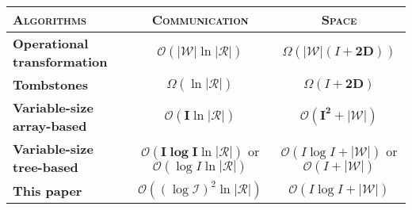 

\begin{tabular}{@{}lcc@{}}
  \toprule
  \textsc{Algorithms} & \textsc{Communication} & \textsc{Space} \\ \midrule 
  \textbf{Operational transformation~\cite{suleiman1997serialization, sun2009contextbased}} & $\mathcal{O}(\pmb{|\mathcal{W}|}\ln|\mathcal{R}|)$ & $\Omega (\pmb{|\mathcal{W}|}(I+\pmb{2D}))$ \\ \midrule
  \textbf{Tombstones~\cite{ahmed2011evaluating, oster2006data, weiss2007wooki}} & $\Omega (\ln|\mathcal{R}|)$ & $\Omega (I+\pmb{2D})$ \\ \midrule
  \textbf{Variable-size array-based~\cite{weiss2009logoot}} & $\mathcal{O}(\pmb{I}\ln |\mathcal{R}|)$ & $\mathcal{O}(\pmb{I^2+|\mathcal{W}|})$ \\ \midrule
  \textbf{Variable-size tree-based~\cite{preguica2009commutative}} & $\mathcal{O}(\pmb{I\log I} \ln |\mathcal{R}|)$ or $\mathcal{O}(\log I\ln|\mathcal{R}|)$ & $\mathcal{O}(I\log I + \pmb{|\mathcal{W}|})$ or $\mathcal{O}(I + \pmb{|\mathcal{W}|})$ \\ \midrule
  \textbf{This paper~\cite{nedelec2013lseq}} & $\mathcal{O}((\log \mathcal{I})^2\ln|\mathcal{R}|)$ & $\mathcal{O}(I\log I + \pmb{|\mathcal{W}|})$ \\ \bottomrule
\end{tabular}

